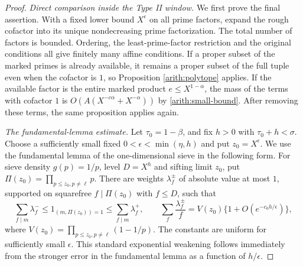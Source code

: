 \documentclass[11pt,a4paper]{article}
\theoremstyle{paperplain}
\numberwithin{equation}{section}
\begin{document}
\begin{proof}
\smallskip\noindent\emph{Direct comparison inside the Type II window.}\quad
We first prove the final assertion.
With a fixed lower bound $X^\epsilon$ on all prime factors, expand
the rough cofactor into its unique nondecreasing prime factorization.
The total number of factors is bounded.
Ordering, the least-prime-factor restriction and the original
conditions all give finitely many affine conditions.
If a proper subset of the marked primes is already available, it
remains a proper subset of the full tuple even when the cofactor is
$1$, so Proposition \ref{arith:polytope} applies.
If the available factor is the entire marked product
$e\le X^{1-\alpha}$, the mass of the terms with cofactor $1$ is
$O(A(X^{-c\alpha}+X^{-\alpha}))$ by \eqref{arith:small-bound}.
After removing these terms, the same proposition applies again.

\smallskip\noindent\emph{The fundamental-lemma estimate.}\quad
Let $\tau_0=1-\beta$, and fix $h>0$ with $\tau_0+h<\sigma$.
Choose a sufficiently small fixed $0<\epsilon<\min(\eta,h)$ and
put $z_0=X^\epsilon$.
We use the fundamental lemma of the one-dimensional sieve
\cite[Section~4.2]{Harman2007} in the following form.
For sieve density $g(p)=1/p$, level $D=X^h$ and sifting limit $z_0$,
put $\Pi(z_0)=\prod_{p\le z_0,p\ne\ell}p$.
There are weights $\lambda_f^\pm$ of absolute value at most $1$,
supported on squarefree $f\mid\Pi(z_0)$ with $f\le D$, such that
\[
 \sum_{f\mid m}\lambda_f^-
 \le 1_{(m,\Pi(z_0))=1}
 \le\sum_{f\mid m}\lambda_f^+,\qquad
 \sum_f\frac{\lambda_f^\pm}{f}
 =V(z_0)\{1+O(e^{-c_0h/\epsilon})\},
\]
where $V(z_0)=\prod_{p\le z_0,p\ne\ell}(1-1/p)$.
The constants are uniform for sufficiently small $\epsilon$.
This standard exponential weakening follows immediately from the
stronger error in the fundamental lemma as a function of
$h/\epsilon$.


\end{proof}
\end{document}
